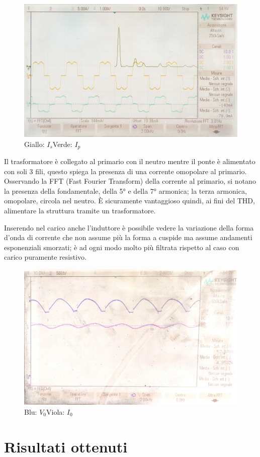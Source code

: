 \documentclass[a4paper,11pt]{article}
\begin{document}
\begin{figure}[H]
 \centering
 \includegraphics[keepaspectratio=true,width=0.9\linewidth]
 {correnti_FFT_2_neg.jpg}
 \caption{Giallo: \(I_s\)\quad Verde: \(I_p\)}
 \label{fig:correnti_fase_carico_R}
 \end{figure}
Il trasformatore è collegato al primario con il neutro mentre il ponte è 
alimentato con soli 3 fili, questo spiega la presenza di una corrente
omopolare al primario. Osservando la FFT (Fast Fourier Transform) della corrente al 
primario, si notano la 
presenza della fondamentale, della \ang{5} e della \ang{7} armonica; la terza 
armonica, omopolare, circola nel neutro. È sicuramente vantaggioso quindi, ai fini 
del THD, alimentare la struttura tramite un trasformatore.
\medskip

Inserendo nel carico anche l'induttore è possibile vedere la variazione della forma
d'onda di corrente che non assume più la forma a cuspide ma assume andamenti 
esponenziali smorzati; è ad ogni modo molto più filtrata rispetto al caso con carico
puramente resistivo.


\begin{figure}[H]
 \centering
 \includegraphics[keepaspectratio=true,width=0.9\linewidth]
 {tensione_e_corrente_3_neg.JPG}
 \caption{Blu: \(V_0\)\quad Viola: \(I_0\)}
 \label{fig:tensioni_carico_RL}
 \end{figure}

\section{Risultati ottenuti}
\end{document}
